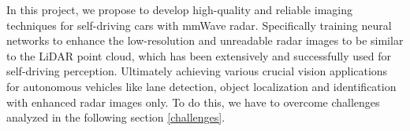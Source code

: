 In this project, we propose to develop high-quality and reliable imaging techniques for self-driving cars with mmWave radar. Specifically training neural networks to enhance the low-resolution and unreadable radar images to be similar to the LiDAR point cloud, which has been extensively and successfully used for self-driving perception. Ultimately achieving various crucial vision applications for autonomous vehicles like lane detection, object localization and identification with enhanced radar images only. To do this, we have to overcome challenges analyzed in the following section \ref{challenges}.
 
